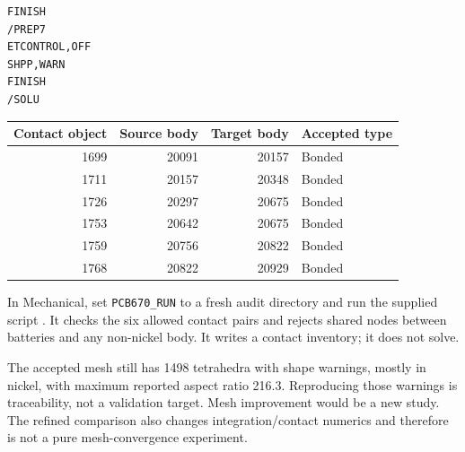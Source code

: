 \documentclass[10pt,a4paper]{article}
\begin{document}
\begin{lstlisting}
FINISH
/PREP7
ETCONTROL,OFF
SHPP,WARN
FINISH
/SOLU
\end{lstlisting}

\begin{center}\small\begin{tabular}{r r r l}\toprule
Contact object & Source body & Target body & Accepted type\\\midrule
1699 & 20091 & 20157 & Bonded\\
1711 & 20157 & 20348 & Bonded\\
1726 & 20297 & 20675 & Bonded\\
1753 & 20642 & 20675 & Bonded\\
1759 & 20756 & 20822 & Bonded\\
1768 & 20822 & 20929 & Bonded\\\bottomrule
\end{tabular}\end{center}
In Mechanical, set \texttt{PCB670\_RUN} to a fresh audit directory and run the supplied script . It checks the six allowed contact pairs and rejects shared nodes between batteries and any non-nickel body. It writes a contact inventory; it does not solve.

The accepted mesh still has 1498 tetrahedra with shape warnings, mostly in nickel, with maximum reported aspect ratio 216.3. Reproducing those warnings is traceability, not a validation target. Mesh improvement would be a new study. The refined comparison also changes integration/contact numerics and therefore is not a pure mesh-convergence experiment.
\end{document}
